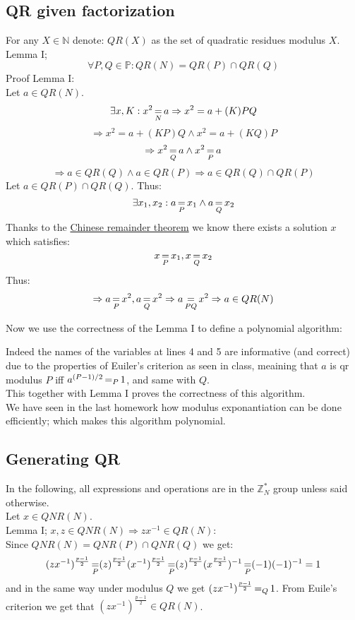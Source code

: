 \subsection{QR given factorization}
For any $X\in\mathbb{N}$ denote: $QR(X)$ as the set of quadratic residues modulus $X$.\\
Lemma I;
\[
	\forall P,Q\in\mathbb{P}:QR(N)=QR(P)\cap QR(Q)
\]
Proof Lemma I:\\
Let $a\in QR(N)$.
\[
	\exists x,K: x^2\operatorname*{=}_N a
	\Rightarrow x^2=a+(K)PQ
\]\[
	\Rightarrow x^2=a+(KP)Q\wedge x^2=a+(KQ)P
\]\[
	\Rightarrow x^2\operatorname*{=}_Qa\wedge x^2\operatorname*{=}_Pa
\]\[
	\Rightarrow a\in QR(Q)\wedge a\in QR(P)
	\Rightarrow a\in QR(Q)\cap QR(P)
\]
Let $a\in QR(P)\cap QR(Q)$.
Thus:
\[
	\exists x_1,x_2: a\operatorname*{=}_Px_1\wedge a\operatorname*{=}_Qx_2	
\]
Thanks to the
\href{https://en.wikipedia.org/wiki/Chinese_remainder_theorem}
{Chinese remainder theorem}
we know there exists a solution $x$ which satisfies:
\[
	x\operatorname*{=}_Px_1,x\operatorname*{=}_Qx_2
\]
Thus:
\[
	\Rightarrow a\operatorname*{=}_Px^2,a\operatorname*{=}_Qx^2
	\Rightarrow a\operatorname*{=}_{PQ}x^2
	\Rightarrow a\in QR(N)
\]

Now we use the correctness of the Lemma I to define a polynomial algorithm:


Indeed the names of the variables at lines 4 and 5 are informative (and correct) due
to the properties of Euiler's criterion as seen in class, meaining that
$a$ is qr modulus $P$ iff $a^{(P-1)/2}\operatorname*{=}_P1$, and same with $Q$.\\
This together with Lemma I proves the correctness of this algorithm.\\

We have seen in the last homework how modulus exponantiation can be done efficiently;
which makes this algorithm polynomial.

\subsection{Generating QR}
In the following, all expressions and operations are in the $\mathbb{Z}_N^*$ group
unless said otherwise.\\
Let $x\in QNR(N)$.\\

Lemma I; $x,z\in QNR(N)\Rightarrow zx^{-1}\in QR(N)$:\\
Since $QNR(N)=QNR(P)\cap QNR(Q)$ we get:
\[
	(zx^{-1})^{\frac{p-1}{2}}
	\operatorname*{=}_P(z)^{\frac{p-1}{2}}(x^{-1})^{\frac{p-1}{2}}
	\operatorname*{=}_P(z)^{\frac{p-1}{2}}(x^{\frac{p-1}{2}})^{-1}
	\operatorname*{=}_P(-1)(-1)^{-1}=1
\]
and in the same way under modulus $Q$ we get $(zx^{-1})^{\frac{p-1}{2}}\operatorname*{=}_Q1$.
From Euile's criterion we get that $(zx^{-1})^{\frac{p-1}{2}}\in QR(N)$.\\

